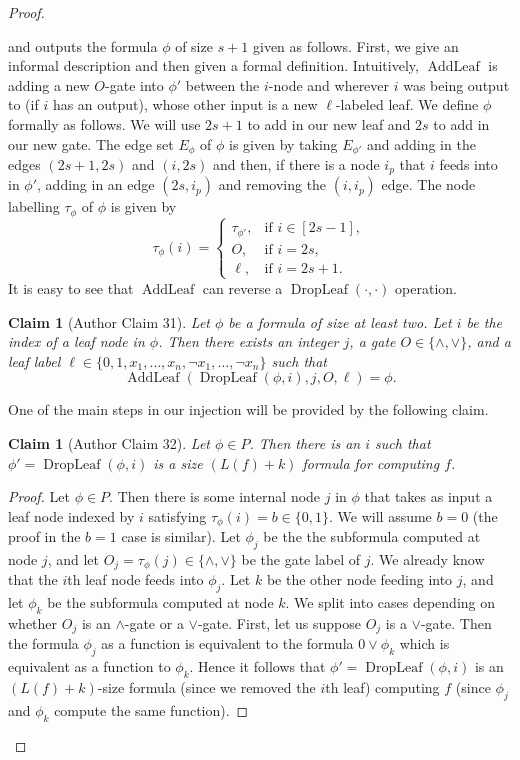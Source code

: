 \documentclass[10pt,a4paper]{article}
\newtheorem{ntclaim}[nttheorem]{Claim}
\newcommand{\DropLeaf}{\operatorname{DropLeaf}}
\newcommand{\AddLeaf}{\operatorname{AddLeaf}}
\begin{document}
\begin{proof}
\begin{itemize}
\end{itemize}
and outputs the formula $\phi$ of size $s+1$ given as follows. First, we give an informal description and then given a formal definition.
Intuitively, $\AddLeaf$ is adding a new $O$-gate into $\phi'$ between the $i$-node and wherever $i$ was being output to (if $i$ has an output), whose other input is a new $\ell$-labeled leaf.
We define $\phi$ formally as follows. We will use $2s+1$ to add in our new leaf and $2s$ to add in our new gate. The edge set $E_\phi$ of $\phi$ is given by taking $E_{\phi'}$ and adding in the edges $(2s+1,2s)$ and $(i,2s)$ and then, if there is a node $i_p$ that $i$ feeds into in $\phi'$, adding in an edge $(2s,i_p)$ and removing the $(i,i_p)$ edge. The node labelling $\tau_\phi$ of $\phi$ is given by
\[\tau_\phi(i)=\begin{cases}\tau_{\phi'},&\text{if }i\in[2s-1],\\O,&\text{if }i=2s,\\\ell,&\text{if }i=2s+1.\end{cases}\]
It is easy to see that $\AddLeaf$ can reverse a $\DropLeaf(\cdot,\cdot)$ operation.
\begin{ntclaim}[Author Claim 31]
Let $\phi$ be a formula of size at least two. Let $i$ be the index of a leaf node in $\phi$. Then there exists an integer $j$, a gate $O\in\{\land,\lor\}$, and a leaf label $\ell\in\{0,1,x_1,\ldots,x_n,\neg x_1,\ldots,\neg x_n\}$ such that
\[\AddLeaf(\DropLeaf(\phi,i),j,O,\ell)=\phi.\]
\end{ntclaim}
One of the main steps in our injection will be provided by the following claim.
\begin{ntclaim}[Author Claim 32]
Let $\phi\in P$. Then there is an $i$ such that $\phi'=\DropLeaf(\phi,i)$ is a size $(L(f)+k)$ formula for computing $f$.
\end{ntclaim}
\begin{proof}
Let $\phi\in P$. Then there is some internal node $j$ in $\phi$ that takes as input a leaf node indexed by $i$ satisfying $\tau_\phi(i)=b\in\{0,1\}$. We will assume $b=0$ (the proof in the $b=1$ case is similar).
Let $\phi_j$ be the the subformula computed at node $j$, and let $O_j=\tau_\phi(j)\in\{\land,\lor\}$ be the gate label of $j$. We already know that the $i$th leaf node feeds into $\phi_j$. Let $k$ be the other node feeding into $j$, and let $\phi_k$ be the subformula computed at node $k$. We split into cases depending on whether $O_j$ is an $\land$-gate or a $\lor$-gate.
First, let us suppose $O_j$ is a $\lor$-gate. Then the formula $\phi_j$ as a function is equivalent to the formula $0\lor\phi_k$ which is equivalent as a function to $\phi_k$. Hence it follows that $\phi'=\DropLeaf(\phi,i)$ is an $(L(f)+k)$-size formula (since we removed the $i$th leaf) computing $f$ (since $\phi_j$ and $\phi_k$ compute the same function).

\end{proof}
\end{proof}
\end{document}
